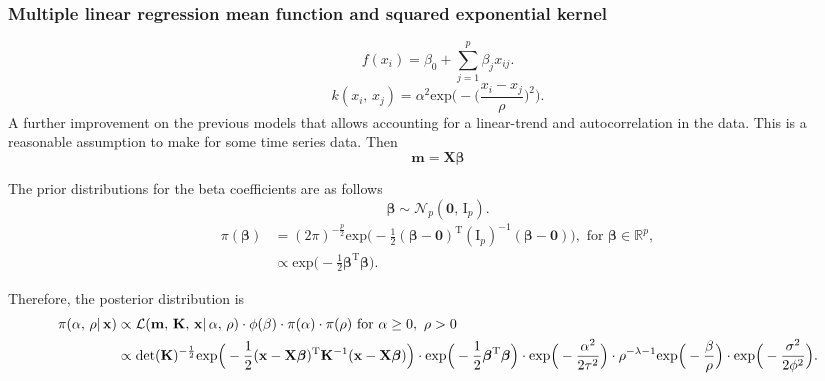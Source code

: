       \subsubsection{Multiple linear regression mean function and squared exponential kernel}

         \[f(x_{i}) = \beta_{0} + \sum_{j=1}^{p} \beta_{j} x_{ij}.\]
         \[k(x_{i},\, x_{j}) = \alpha^{2} \text{exp} \bigg(- \Big(\frac{x_i - x_j}{\rho} \Big)^2 \bigg).\]
         A further improvement on the previous models that allows accounting for a linear-trend and autocorrelation in the data. This is a reasonable assumption to make for some time series data.
         Then \[\mathbf{m} = \mathbf{X}\boldsymbol{\beta}\]

         The prior distributions for the beta coefficients are as follows
         \[\boldsymbol{\beta} \sim \mathcal{N}_{p}(\mathbf{0},\, \text{I}_{p}).\]
         \begin{align*}
            \pi(\boldsymbol{\beta}) 
            & = (2\pi)^{-\frac{p}{2}} \text{exp} \Big( -\frac{1}{2} (\boldsymbol{\beta} - \mathbf{0})^{\text{T}} (\text{I}_{p})^{-1}(\boldsymbol{\beta} - \mathbf{0}) \Big), \text{ for } \boldsymbol{\beta} \in \mathbb{R}^{p},\\
            & \propto \text{exp} \Big( -\frac{1}{2} \boldsymbol{\beta}^{\text{T}} \boldsymbol{\beta} \Big).
         \end{align*}

         Therefore, the posterior distribution is
         \begin{align*}
            \pi(\alpha,\, \rho| \, \mathbf{x}) 
            & \propto \mathcal{L}(\mathbf{m},\, \mathbf{K},\, \mathbf{x}| \, \alpha,\, \rho) 
            \cdot \phi(\beta)
            \cdot \pi(\alpha) 
            \cdot \pi(\rho) 
            \text{ for } \alpha \geq 0,\ \rho > 0\\
            & \propto \text{det}(\mathbf{K})^{-\frac{1}{2}} 
            \text{exp} \Big(-\frac{1}{2} (\mathbf{x} - \mathbf{X}\boldsymbol{\beta})^{\text{\text{T}}} \mathbf{K}^{-1} (\mathbf{x} - \mathbf{X}\boldsymbol{\beta}) \Big)
            \cdot \text{exp} \Big( -\frac{1}{2} \boldsymbol{\beta}^{\text{T}} \boldsymbol{\beta} \Big)
            \cdot \text{exp} \Big(-\frac{\alpha^2}{2\tau^2} \Big) 
            \cdot \rho^{-\lambda-1} \text{exp} \Big(-\frac{\beta}{\rho} \Big) 
            \cdot \text{exp} \Big(-\frac{\sigma^2}{2\phi^2} \Big).
         \end{align*}
         
